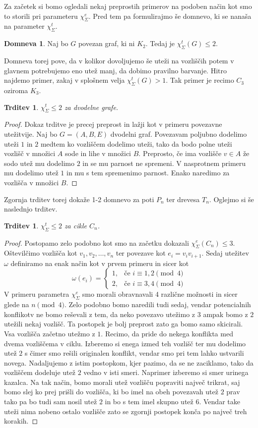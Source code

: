 \documentclass[12pt,a4paper,twoside]{article}
\theoremstyle{definition} %
\newtheorem{domneva}[definicija]{Domneva}
\theoremstyle{plain} %
\newtheorem{trditev}[definicija]{Trditev}
\newcommand{\ec}{\chi_{\Sigma}^e}
\newcommand{\ect}{\chi_{\Sigma}^t}
\numberwithin{equation}{section}  %
\begin{document}
Za začetek si bomo ogledali nekaj preprostih primerov na podoben način kot smo to storili pri parameteru $\ec$. Pred tem pa formulirajmo še domnevo, ki se nanaša na parameter $\ect$.
\begin{domneva} 
	\label{12conjecture}
	Naj bo $G$ povezan graf, ki ni $K_2$. Tedaj je $\ect(G) \le 2.$ 
\end{domneva}
Domneva torej pove, da v kolikor dovoljujemo še uteži na vozliščih potem v glavnem potrebujemo eno utež manj, da dobimo pravilno barvanje. Hitro najdemo primer, zakaj v splošnem velja $\ect(G) > 1$. Tak primer je recimo $C_3$ oziroma $K_3$.
\begin{trditev}
$\ect \le 2$ za dvodelne grafe.
\end{trditev}
\begin{proof}
Dokaz trditve je precej preprost in lažji kot v primeru povezavne utežitvije. Naj bo $G = (A,B, E)$ dvodelni graf. Povezavam  poljubno dodelimo uteži $1$ in $2$ medtem ko vozliščem dodelimo uteži, tako da bodo polne uteži vozlišč v množici $A$ sode in lihe v množici $B$. Preprosto, če ima vozlišče $v \in A$ že sodo utež mu dodelimo $2$ in se mu parnost ne spremeni. V nasprotnem primeru mu dodelimo utež $1$ in mu s tem spremenimo parnost. Enako naredimo za vozlišča v množici $B$.
\end{proof}
Zgornja trditev torej dokaže 1-2 domnevo za poti $P_n$ ter drevesa $T_n$. Oglejmo si še naslednjo trditev.
\begin{trditev}
$\ect \le 2$ za cikle $C_n$.
\end{trditev}
\begin{proof}
Postopamo zelo podobno kot smo na začetku dokazali $\ec(C_n) \le 3$. Oštevilčimo vozlišča kot $v_1, v_2, \ldots, v_n$ ter povezave kot $e_i = v_iv_{i+1}$. Sedaj utežitev $\omega$ definiramo na enak način kot v prvem primeru in sicer kot
\begin{equation*}
	\omega(e_i) = \begin{cases}
	1, & \text{če } i \equiv 1,2 \pmod{4}\\ 
	2, &\text{če } i \equiv 3,4 \pmod{4}
	\end{cases}
	\end{equation*}
V primeru parametra $\ec$ smo morali obravnavali 4 različne možnosti in sicer glede na $ n \pmod{4}$. Zelo podobno bomo naredili tudi sedaj, vendar potencialnih konflikotv ne bomo reševali z tem, da neko povezavo utežimo z $3$ ampak bomo z $2$ utežili nekaj vozlišč. Ta postopek je bolj preprost zato ga bomo samo skicirali. Vsa vozlišča začetno utežmo z $1$. Recimo, da pride do nekega konflikta med dvema vozliščema v ciklu. Izberemo si enega izmed teh vozlišč ter mu dodelimo utež $2$ s čimer smo rešili originalen konflikt, vendar smo pri tem lahko ustvarili novega. Nadaljujemo z istim postopkom, kjer pazimo, da se ne zaciklamo, tako da vozliščem dodeluje utež $2$ vedno v isti smeri. Naprimer izberemo si smer urinega kazalca. Na tak način, bomo morali utež vozlišču popraviti največ trikrat, saj bomo slej ko prej prišli do vozlišča, ki bo imel na obeh povezavah utež $2$ prav tako pa bo tudi sam nosil utež $2$ in bo s tem imel skupno utež $6$. Vendar take uteži nima nobeno ostalo vozlišče zato se zgornji postopek konča po največ treh korakih.
\end{proof}
\end{document}
